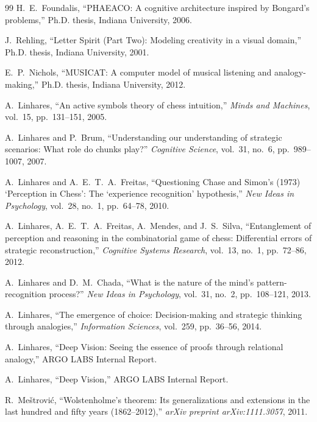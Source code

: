 \documentclass[11pt]{article}
\theoremstyle{definition}
\theoremstyle{remark}
\begin{document}
\begin{thebibliography}{99}
H.~E.~Foundalis, ``PHAEACO: A cognitive architecture inspired by Bongard's problems,'' Ph.D. thesis, Indiana University, 2006.

J.~Rehling, ``Letter Spirit (Part Two): Modeling creativity in a visual domain,'' Ph.D. thesis, Indiana University, 2001.

E.~P.~Nichols, ``MUSICAT: A computer model of musical listening and analogy-making,'' Ph.D. thesis, Indiana University, 2012.

A.~Linhares, ``An active symbols theory of chess intuition,'' \emph{Minds and Machines}, vol.~15, pp.~131--151, 2005.

A.~Linhares and P.~Brum, ``Understanding our understanding of strategic scenarios: What role do chunks play?'' \emph{Cognitive Science}, vol.~31, no.~6, pp.~989--1007, 2007.

A.~Linhares and A.~E.~T.~A.~Freitas, ``Questioning Chase and Simon's (1973) `Perception in Chess': The `experience recognition' hypothesis,'' \emph{New Ideas in Psychology}, vol.~28, no.~1, pp.~64--78, 2010.

A.~Linhares, A.~E.~T.~A.~Freitas, A.~Mendes, and J.~S.~Silva, ``Entanglement of perception and reasoning in the combinatorial game of chess: Differential errors of strategic reconstruction,'' \emph{Cognitive Systems Research}, vol.~13, no.~1, pp.~72--86, 2012.

A.~Linhares and D.~M.~Chada, ``What is the nature of the mind's pattern-recognition process?'' \emph{New Ideas in Psychology}, vol.~31, no.~2, pp.~108--121, 2013.

A.~Linhares, ``The emergence of choice: Decision-making and strategic thinking through analogies,'' \emph{Information Sciences}, vol.~259, pp.~36--56, 2014.

A.~Linhares, ``Deep Vision: Seeing the essence of proofs through relational analogy,'' ARGO LABS Internal Report.

A.~Linhares, ``Deep Vision,'' ARGO LABS Internal Report.

R.~Me\v{s}trovi\'c, ``Wolstenholme's theorem: Its generalizations and extensions in the last hundred and fifty years (1862--2012),'' \emph{arXiv preprint arXiv:1111.3057}, 2011.


\end{thebibliography}
\end{document}
